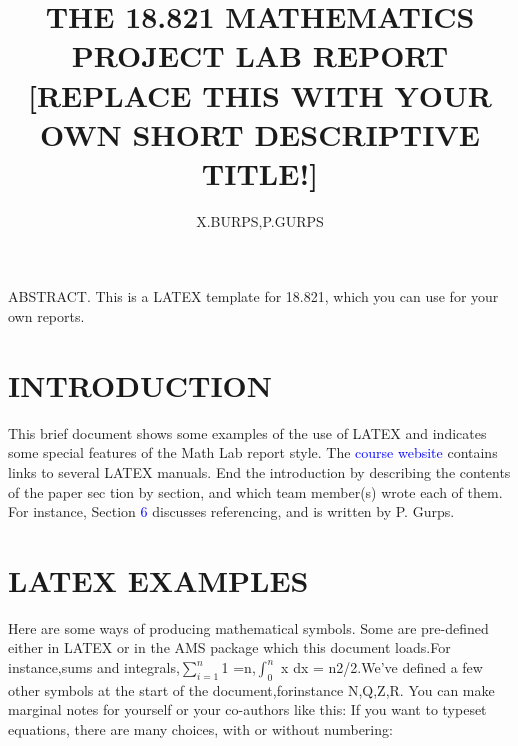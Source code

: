 \documentclass{article}
\title{\textbf{THE 18.821 MATHEMATICS PROJECT LAB REPORT
	[REPLACE THIS WITH YOUR OWN SHORT
	DESCRIPTIVE TITLE!]}}
\author{X.BURPS,P.GURPS}
\begin{document}
	\maketitle
		ABSTRACT. This is a LATEX template for 18.821, which you can\newline
		use for your own reports.
		\centering
	  \section{INTRODUCTION}
	  \large{This brief document shows some examples of the use of LATEX and
	  indicates some special features of the Math Lab report style. The
	  \textcolor{blue}{course website} contains links to several LATEX manuals.\newline
	 \hspace{0.5cm}End the introduction by describing the contents of the paper sec­ 
	  tion by section, and which team member(s) wrote each of them. For
	  instance, Section \textcolor{blue}{6} discusses referencing, and is written by P. Gurps.}
 \section{LATEX EXAMPLES}
 \large{Here are some ways of producing mathematical symbols. Some are \newline
 pre-defined either in LATEX or in the AMS package which this document \newline loads.For instance,sums and integrals,$\sum_{i=1}^{n}$1 =n,$\int_{0}^{n}$ x dx = n2/2.\newline We've defined a few other symbols at the start of the document,for\newline instance N,Q,Z,R. You can make marginal notes for yourself or your co-authors like this:\newline
 If you want to typeset equations, there are many choices, with or without numbering:}\newline
 
\end{document}
